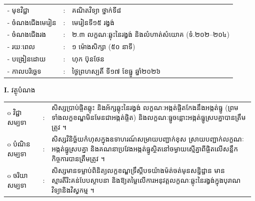\documentclass[a4paper,10pt]{article}
\newcommand{\wcirc}{{\CourierBullet\fontsize{9.5pt}{11pt}\selectfont o}}
\begin{document}
{\renewcommand{\arraystretch}{0.95}
\hspace*{4.05cm}%
\begin{tabular}{@{}l l l@{}}
  - \hspace{0.35cm} មុខវិជ្ជា & : & គណិតវិទ្យា ថ្នាក់ទី៨ \\
  - \hspace{0.35cm} ចំណងជើងមេរៀន & : & មេរៀនទី១៥ រង្វង់ \\
  - \hspace{0.35cm} ចំណងជើងរង & : & ២.៣ លក្ខណៈឆ្លុះនៃរង្វង់ និងលំហាត់សំយោគ (ទំ.២០២--២០៤) \\
  - \hspace{0.35cm} រយៈពេល & : & ១ ម៉ោងសិក្សា (៥០ នាទី) \\
  - \hspace{0.35cm} បង្រៀនដោយ & : & ហុក ប៊ុនថែន \\
  - \hspace{0.35cm} កាលបរិច្ឆេទ & : & ថ្ងៃព្រហស្បតិ៍ ទី១៧ ខែធ្នូ ឆ្នាំ២០២៦ \\
\end{tabular}

\vspace{1pt}

\textbf{I.} {\muol វត្ថុបំណង}\\[1pt]
\hspace*{0.55cm}%
\begin{tabular}{@{}l l L{14.2cm}@{}}
  \wcirc \hspace{0.25cm} វិជ្ជាសម្បទា & : & សិស្សប្រាប់ផ្ចិតឆ្លុះ និងអ័ក្សឆ្លុះនៃរង្វង់ លក្ខណៈអង្កត់ផ្ចិតកែងនឹងអង្កត់ធ្នូ (ព្រមទាំងលក្ខខណ្ឌមិនមែនជាអង្កត់ផ្ចិត) និងលក្ខណៈធ្នូចន្លោះអង្កត់ធ្នូស្របគ្នាបានត្រឹមត្រូវ ។ \\
  \wcirc \hspace{0.25cm} បំណិនសម្បទា & : & សិស្សវិនិច្ឆ័យកំហុសក្នុងឧទាហរណ៍សម្រាយបញ្ជាក់ខុស ស្រាយបញ្ជាក់លក្ខណៈអង្កត់ធ្នូស្របគ្នា និងគណនាប្រវែងអង្កត់ធ្នូស្ថិតនៅចម្ងាយស្មើគ្នាពីផ្ចិតលើសន្លឹកកិច្ចការបានត្រឹមត្រូវ ។ \\
  \wcirc \hspace{0.25cm} ចរិយាសម្បទា & : & សិស្សមានទម្លាប់ពិនិត្យលក្ខខណ្ឌទ្រឹស្ដីបទយ៉ាងម៉ត់ចត់មុនសន្និដ្ឋាន មានស្មារតីរិះគន់បែបស្ថាបនា និងឱ្យតម្លៃលើការអនុវត្តលក្ខណៈឆ្លុះនៃរង្វង់ក្នុងបុរាណវិទ្យានិងវិស្វកម្ម ។ \\
\end{tabular}

\vspace{1pt}

}
\end{document}
